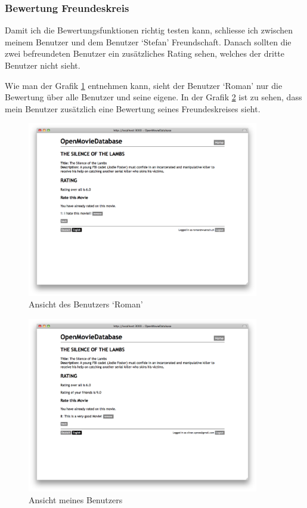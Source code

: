 \subsubsection{Bewertung Freundeskreis}
Damit ich die Bewertungsfunktionen richtig testen kann, schliesse ich
zwischen meinem Benutzer und dem Benutzer `Stefan' Freundschaft. Danach sollten 
die zwei befreundeten Benutzer ein zusätzliches Rating sehen, welches der dritte 
Benutzer nicht sieht. 

Wie man der Grafik \ref{test_bewertung_04} entnehmen kann, sieht der Benutzer
`Roman' nur die Bewertung über alle Benutzer und seine eigene. In der Grafik
\ref{test_bewertung_05} ist zu sehen, dass mein Benutzer zusätzlich eine
Bewertung seines Freundeskreises sieht.

\begin{figure}[ht]
    \begin{center}
        \includegraphics[width=0.9\textwidth,angle=0]{./bilder/tests/test_bewertung_04.png}
        \caption{Ansicht des Benutzers `Roman'}
        \label{test_bewertung_04}
    \end{center}
\end{figure}

\begin{figure}[ht]
    \begin{center}
        \includegraphics[width=0.9\textwidth,angle=0]{./bilder/tests/test_bewertung_05.png}
        \caption{Ansicht meines Benutzers}
        \label{test_bewertung_05}
    \end{center}
\end{figure}

